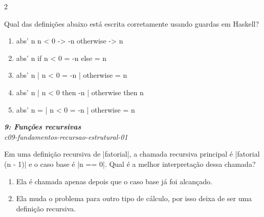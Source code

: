 \documentclass[a4paper,10pt,brazil]{article}
\begin{document}
\begin{multicols}{2}
\begin{flushright}
\end{flushright}
Qual das definições abaixo está escrita corretamente usando guardas em Haskell?

\begin{enumerate}
  \item \begin{haskellcode}
abs' n
  n < 0 -> -n
  otherwise -> n
\end{haskellcode}

  \item \begin{haskellcode}
abs' n
  if n < 0 = -n
  else     = n
\end{haskellcode}

  \item \begin{haskellcode}
abs' n
  | n < 0     = -n
  | otherwise = n
\end{haskellcode}

  \item \begin{haskellcode}
abs' n
  | n < 0 then -n
  | otherwise then n
\end{haskellcode}

  \item \begin{haskellcode}
abs' n =
  | n < 0     = -n
  | otherwise = n
\end{haskellcode}


\end{enumerate}

\begin{flushright}
  \footnotesize
  \textit{\textbf{9: Funções recursivas}}\\
  \textit{c09-fundamentos-recursao-estrutural-01}\\

\end{flushright}
Em uma definição recursiva de \haskellinline|fatorial|, a chamada recursiva principal é
\haskellinline|fatorial (n - 1)| e o caso base é \haskellinline|n == 0|. Qual é a melhor interpretação dessa chamada?

\begin{enumerate}
  \item Ela é chamada apenas depois que o caso base já foi alcançado.

  \item Ela muda o problema para outro tipo de cálculo, por isso deixa de ser uma definição recursiva.


\end{enumerate}
\end{multicols}
\end{document}
